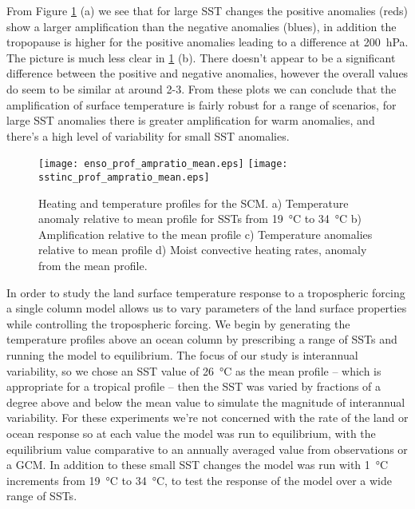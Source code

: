 From Figure \ref{fig:scmsstamp} (a) we see that for large SST changes the 
positive anomalies (reds) show a larger amplification than the negative 
anomalies (blues), in addition the tropopause is higher for the positive 
anomalies leading to a difference at \SI{200}{\hecto\pascal}. The picture is 
much less clear in \ref{fig:scmsstamp} (b). There doesn't appear to be a 
significant difference between the positive and negative anomalies, however the 
overall values do seem to be similar at around 2-3. From these plots we can 
conclude that the amplification of surface temperature is fairly robust for a 
range of scenarios, for large SST anomalies there is greater amplification for 
warm anomalies, and there's a high level of variability for small SST anomalies.

\begin{figure}[ht]
\texttt{[image: enso\_prof\_ampratio\_mean.eps]}
\texttt{[image: sstinc\_prof\_ampratio\_mean.eps]}\\
\caption{Heating and temperature profiles for the SCM. a) Temperature anomaly 
	relative to mean profile for SSTs from \SI{19}{\degreeCelsius} to 
	\SI{34}{\degreeCelsius} b) Amplification relative to the mean profile c) 
	Temperature anomalies relative to mean profile d) Moist convective heating 
rates, anomaly from the mean profile.}
\label{fig:scmsstamp}
\end{figure}

In order to study the land surface temperature response to a tropospheric 
forcing a single column model allows us to vary parameters of the land surface 
properties while controlling the tropospheric forcing.  We begin by generating 
the temperature profiles above an ocean column by prescribing a range of SSTs 
and running the model to equilibrium.  The focus of our study is interannual 
variability, so we chose an SST value of \SI{26}{\degreeCelsius} as the mean 
profile -- which is appropriate for a tropical profile -- then the SST was 
varied by fractions of a degree above and below the mean value to simulate the 
magnitude of interannual variability. For these experiments we're not concerned 
with the rate of the land or ocean response so at each value the model was run 
to equilibrium, with the equilibrium value comparative to an annually averaged 
value from observations or a GCM.  In addition to these small SST changes the 
model was run with \SI{1}{\degreeCelsius} increments from 
\SI{19}{\degreeCelsius} to \SI{34}{\degreeCelsius}, to test the response of the 
model over a wide range of SSTs.

